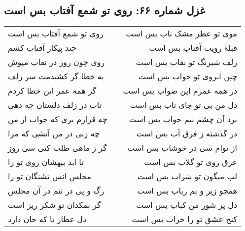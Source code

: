\begin{center}
\section*{غزل شماره ۶۶: روی تو شمع آفتاب بس است}
\label{sec:066}
\begin{longtable}{l p{0.5cm} r}
روی تو شمع آفتاب بس است
&&
موی تو عطر مشک ناب بس است
\\
چند پیکار آفتاب کشم
&&
قبلهٔ رویت آفتاب بس است
\\
روی چون روز در نقاب مپوش
&&
زلف شبرنگ تو نقاب بس است
\\
به خطا گر کشیدمت سر زلف
&&
چین ابروی تو جواب بس است
\\
گر همه عمر این خطا کردم
&&
در همه عمرم این صواب بس است
\\
تاب در زلف دلستان چه دهی
&&
دل من بی تو جای تاب بس است
\\
چه قرارم بری که خواب از من
&&
برد آن چشم نیم خواب بس است
\\
چه زنی در من آتشی که مرا
&&
در گذشته ز فرق آب بس است
\\
گر ز ماهی طلب کنی سی روز
&&
از توام سی در خوشاب بس است
\\
تا ابد بیهشان روی تو را
&&
عرق روی تو گلاب بس است
\\
مجلس انس تشنگان تو را
&&
لب میگون تو شراب بس است
\\
رگ و پی در تنم در آن مجلس
&&
همچو زیر و بم رباب بس است
\\
گر نمکدان تو شکر ریز است
&&
دل پر شور من کباب بس است
\\
دل عطار تا که جان دارد
&&
کنج عشق تو را خراب بس است
\\
\end{longtable}
\end{center}
